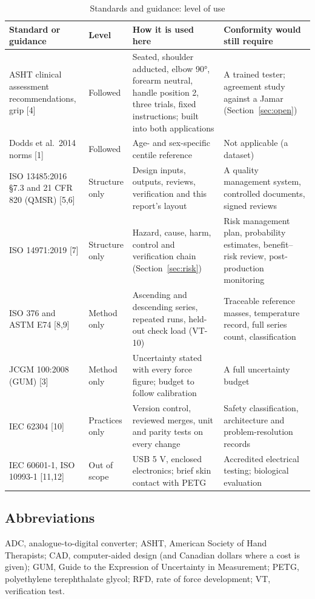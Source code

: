 \documentclass[10pt,a4paper]{article}
\begin{document}
\begin{table}[H]
\centering\small
\caption{Standards and guidance: level of use}\label{tab:standards}
\begin{tabularx}{\linewidth}{@{}P{3.7cm}P{2.0cm}LL@{}}
\toprule
Standard or guidance & Level & How it is used here & Conformity would still require \\
\midrule
ASHT clinical assessment recommendations, grip [4] & Followed & Seated, shoulder adducted, elbow 90°, forearm neutral, handle position 2, three trials, fixed instructions; built into both applications & A trained tester; agreement study against a Jamar (Section~\ref{sec:open}) \\
Dodds et al.\ 2014 norms [1] & Followed & Age- and sex-specific centile reference & Not applicable (a dataset) \\
ISO 13485:2016 §7.3 and 21 CFR 820 (QMSR) [5,6] & Structure only & Design inputs, outputs, reviews, verification and this report's layout & A quality management system, controlled documents, signed reviews \\
ISO 14971:2019 [7] & Structure only & Hazard, cause, harm, control and verification chain (Section~\ref{sec:risk}) & Risk management plan, probability estimates, benefit–risk review, post-production monitoring \\
ISO 376 and ASTM E74 [8,9] & Method only & Ascending and descending series, repeated runs, held-out check load (VT-10) & Traceable reference masses, temperature record, full series count, classification \\
JCGM 100:2008 (GUM) [3] & Method only & Uncertainty stated with every force figure; budget to follow calibration & A full uncertainty budget \\
IEC 62304 [10] & Practices only & Version control, reviewed merges, unit and parity tests on every change & Safety classification, architecture and problem-resolution records \\
IEC 60601-1, ISO 10993-1 [11,12] & Out of scope & USB 5 V, enclosed electronics; brief skin contact with PETG & Accredited electrical testing; biological evaluation \\
\bottomrule
\end{tabularx}
\end{table}

\subsection{Abbreviations}
ADC, analogue-to-digital converter; ASHT, American Society of Hand Therapists; CAD, computer-aided design (and Canadian dollars where a cost is given); GUM, Guide to the Expression of Uncertainty in Measurement; PETG, polyethylene terephthalate glycol; RFD, rate of force development; VT, verification test.
\end{document}
